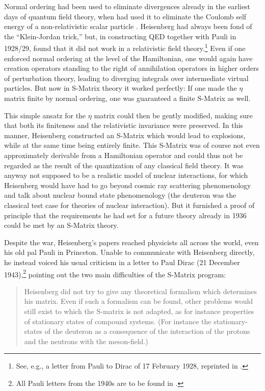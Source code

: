\documentclass[12pt,a4paper]{article}
\begin{document}
Normal ordering had been used to eliminate divergences already in the earliest days of quantum field theory, when \cite{jordan_1927_zum-mehrkorperproblem} had used it to eliminate the Coulomb self energy of a non-relativistic scalar particle . Heisenberg had always been fond of the ``Klein-Jordan trick,'' but, in constructing QED together with Pauli in 1928/29, found that it did not work in a relativistic field theory.\footnote{See, e.g., a letter from Pauli to Dirac of 17 February 1928, reprinted in \citep{hermann_1979_wissenschaftlicher}.} Even if one enforced normal ordering at the level of the Hamiltonian, one would again have creation operators standing to the right of annihilation operators in higher orders of perturbation theory, leading to diverging integrals over intermediate virtual particles. But now in S-Matrix theory it worked perfectly: If one made the $\eta$ matrix finite by normal ordering, one was guaranteed a finite S-Matrix as well.

This simple ansatz for the $\eta$ matrix could then be gently modified, making sure that both its finiteness and the relativistic invariance were preserved. In this manner, Heisenberg constructed an S-Matrix which would lead to explosions, while at the same time being entirely finite. This S-Matrix was of course not even approximately derivable from a Hamiltonian operator and could thus not be regarded as the result of the quantization of any classical field theory. It was anyway not supposed to be a realistic model of nuclear interactions, for which Heisenberg would have had to go beyond cosmic ray scattering phenomenology and talk about nuclear bound state phenomenology (the deuteron was the classical test case for theories of nuclear interaction). But it furnished a proof of principle that the requirements he had set for a future theory already in 1936 could be met by an S-Matrix theory.

Despite the war, Heisenberg's papers reached physicists all across the world, even his old  pal Pauli in Princeton. Unable to communicate with Heisenberg directly, he instead voiced his usual criticism in a letter to Paul Dirac (21 December 1943),\footnote{All Pauli letters from the 1940s are to be found in \citep{meyenn_1993_wissenschaftlicher}.} pointing out the two main difficulties of the S-Matrix program:

\begin{quote}
Heisenberg did not try to give any theoretical formalism which determines his matrix. Even if such a formalism can be found, other problems would still exist to which the S-matrix is not adapted, as for instance properties of stationary states of compound systems. (For instance the stationary-states of the deuteron as a consequence of the interaction of the protons and the neutrons with the meson-field.)
\end{quote}
\end{document}
